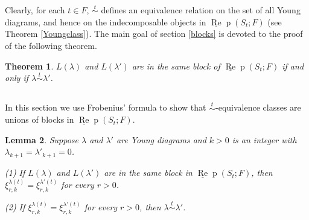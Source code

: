 \documentclass{amsart}
\newtheorem{theorem}{Theorem}[section]
\newtheorem{lemma}[theorem]{Lemma}
\theoremstyle{definition}
\def\uRep{\underline{\operatorname{Re}}\!\operatorname{p}}
\renewcommand{\1}{_{(1)}}
\renewcommand{\2}{_{(2)}}
\newcommand{\3}{_{(3)}}
\newcommand{\4}{_{(4)}}
\begin{document}
Clearly, for each $t\in F$,  $\stackrel{t}{\sim}$ defines an equivalence relation on the set of all Young diagrams, and hence on the indecomposable objects in $\uRep(S_t; F)$ (see Theorem \ref{Youngclass}).
The main goal of section \ref{blocks} is devoted to the proof of the following theorem.

\begin{theorem}\label{blocksinSt} $L(\lambda)$ and $L(\lambda')$ are in the same block of $\uRep(S_t; F)$ if and only if $\lambda\stackrel{t}{\sim}\lambda'$.
\end{theorem}




\subsection{}  In this section we use Frobenius' formula to show that $\stackrel{t}{\sim}$-equivalence classes are unions  of blocks in $\uRep(S_t; F)$.

\begin{lemma}\label{equalxi} Suppose $\lambda$ and $\lambda'$ are Young diagrams and $k>0$ is an integer with $\lambda_{k+1}=\lambda'_{k+1}=0$.
 
 (1)  If $L(\lambda)$ and $L(\lambda')$ are in the same block in $\uRep(S_t; F)$, then $\xi^{\lambda(t)}_{r, k}=\xi^{\lambda'(t)}_{r, k}$ for every $r>0$.

(2) If $\xi^{\lambda(t)}_{r, k}=\xi^{\lambda'(t)}_{r, k}$ for every $r>0$, then $\lambda\stackrel{t}{\sim}\lambda'$.
\end{lemma}
\end{document}
